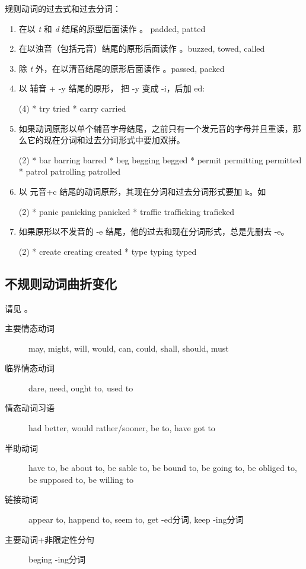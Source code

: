 规则动词的过去式和过去分词：
\begin{enumerate}
\item 在以 \emph{t} 和 \emph{d} 结尾的原型后面读作 。 padded, patted
\item 在以浊音（包括元音）结尾的原形后面读作 。buzzed, towed, called
\item 除 \emph{t} 外，在以清音结尾的原形后面读作 。passed, packed
\item 以 辅音 + -y 结尾的原形， 把 -y 变成 -i，后加 ed:
  \begin{taskitem}(4)
    * try \Rightarrow tried
    * carry  \Rightarrow carried
  \end{taskitem}

\item 如果动词原形以单个辅音字母结尾，之前只有一个发元音的字母并且重读，那么它的现在分词和过去分词形式中要加双拼。
  \begin{taskitem}(2)
    * bar \Rightarrow barring \Rightarrow barred
    * beg \Rightarrow begging \Rightarrow begged
    * permit \Rightarrow permitting \Rightarrow permitted
    * patrol \Rightarrow patrolling \Rightarrow patrolled
  \end{taskitem}

\item 以 元音+c 结尾的动词原形，其现在分词和过去分词形式要加 k。如
  \begin{taskitem}(2)
    * panic \Rightarrow panicking \Rightarrow panicked
    * traffic \Rightarrow trafficking \Rightarrow traficked
  \end{taskitem}

\item 如果原形以不发音的 -e 结尾，他的过去和现在分词形式，总是先删去 -e。
  \begin{taskitem}(2)
    * create \Rightarrow creating \Rightarrow created
    * type \Rightarrow typing \Rightarrow typed
  \end{taskitem}
\end{enumerate}

\subsection{不规则动词曲折变化}

请见 。

\begin{description}
\item [主要情态动词] may, might, will, would, can, could,
  shall, should, must
\item[临界情态动词] dare, need, ought to, used to
\item[情态动词习语] had better, would rather/sooner, be to, have got to
\item[半助动词] have to, be about to, be sable to, be bound to, be going to, be
  obliged to, be supposed to, be willing to
\item[链接动词] appear to, happend to, seem to, get -ed分词, keep -ing分词
\item[主要动词+非限定性分句] beging -ing分词
\end{description}

